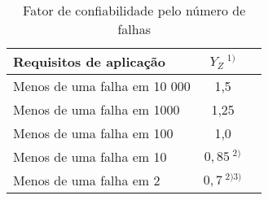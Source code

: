 \begin{table}[]
\centering
\caption{\label{tab:2} Fator de confiabilidade pelo número de falhas}
\begin{tabular}{ l c c}
\hline
\textbf{Requisitos de aplicação}        &\textbf{$Y_Z \ ^{1)}$} \\ \hline
Menos de uma falha em 10 000            & 1,5       \\
Menos de uma falha em 1000              & 1,25      \\
Menos de uma falha em 100               & 1,0       \\
Menos de uma falha em 10                & $0,85\ ^{2)}$   \\
Menos de uma falha em 2                 & $0,7\ ^{2) 3)}$
\end{tabular}
\end{table}